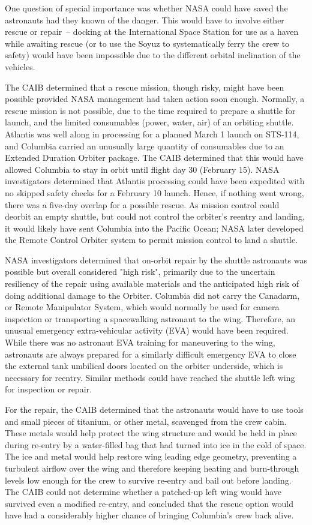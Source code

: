 One question of special importance was whether NASA could have saved the
astronauts had they known of the danger. This would have to involve
either rescue or repair~-- docking at the International Space Station
for use as a haven while awaiting rescue (or to use the Soyuz to
systematically ferry the crew to safety) would have been impossible due
to the different orbital inclination of the vehicles.

The CAIB determined that a rescue mission, though risky, might have been
possible provided NASA management had taken action soon enough.
Normally, a rescue mission is not possible, due to the time required to
prepare a shuttle for launch, and the limited consumables (power, water,
air) of an orbiting shuttle. Atlantis was well along in processing for a
planned March 1 launch on STS-114, and Columbia carried an unusually
large quantity of consumables due to an Extended Duration Orbiter
package. The CAIB determined that this would have allowed Columbia to
stay in orbit until flight day 30 (February 15). NASA investigators
determined that Atlantis processing could have been expedited with no
skipped safety checks for a February 10 launch. Hence, if nothing went
wrong, there was a five-day overlap for a possible rescue. As mission
control could deorbit an empty shuttle, but could not control the
orbiter's reentry and landing, it would likely have sent Columbia into
the Pacific Ocean; NASA later developed the Remote Control Orbiter
system to permit mission control to land a shuttle.

NASA investigators determined that on-orbit repair by the shuttle
astronauts was possible but overall considered "high risk", primarily
due to the uncertain resiliency of the repair using available materials
and the anticipated high risk of doing additional damage to the Orbiter.
Columbia did not carry the Canadarm, or Remote Manipulator System, which
would normally be used for camera inspection or transporting a
spacewalking astronaut to the wing. Therefore, an unusual emergency
extra-vehicular activity (EVA) would have been required. While there was
no astronaut EVA training for maneuvering to the wing, astronauts are
always prepared for a similarly difficult emergency EVA to close the
external tank umbilical doors located on the orbiter underside, which is
necessary for reentry. Similar methods could have reached the shuttle
left wing for inspection or repair.

For the repair, the CAIB determined that the astronauts would have to
use tools and small pieces of titanium, or other metal, scavenged from
the crew cabin. These metals would help protect the wing structure and
would be held in place during re-entry by a water-filled bag that had
turned into ice in the cold of space. The ice and metal would help
restore wing leading edge geometry, preventing a turbulent airflow over
the wing and therefore keeping heating and burn-through levels low
enough for the crew to survive re-entry and bail out before landing. The
CAIB could not determine whether a patched-up left wing would have
survived even a modified re-entry, and concluded that the rescue option
would have had a considerably higher chance of bringing Columbia's crew
back alive.

